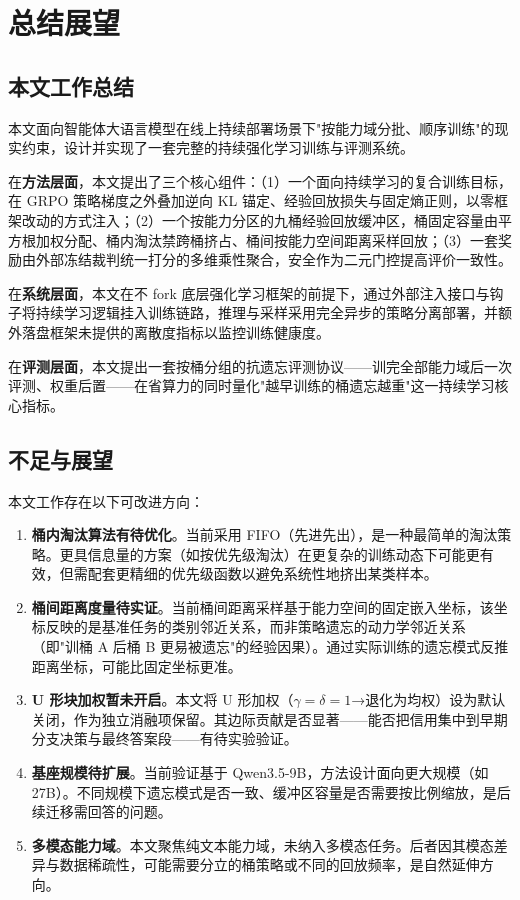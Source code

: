 \chapter{总结展望}
\label{chap:conclusion}

\section{本文工作总结}

本文面向智能体大语言模型在线上持续部署场景下"按能力域分批、顺序训练"的现实约束，设计并实现了一套完整的持续强化学习训练与评测系统。

在\textbf{方法层面}，本文提出了三个核心组件：（1）一个面向持续学习的复合训练目标，在 GRPO 策略梯度之外叠加逆向 KL 锚定、经验回放损失与固定熵正则，以零框架改动的方式注入；（2）一个按能力分区的九桶经验回放缓冲区，桶固定容量由平方根加权分配、桶内淘汰禁跨桶挤占、桶间按能力空间距离采样回放；（3）一套奖励由外部冻结裁判统一打分的多维乘性聚合，安全作为二元门控提高评价一致性。

在\textbf{系统层面}，本文在不 fork 底层强化学习框架的前提下，通过外部注入接口与钩子将持续学习逻辑挂入训练链路，推理与采样采用完全异步的策略分离部署，并额外落盘框架未提供的离散度指标以监控训练健康度。

在\textbf{评测层面}，本文提出一套按桶分组的抗遗忘评测协议——训完全部能力域后一次评测、权重后置——在省算力的同时量化"越早训练的桶遗忘越重"这一持续学习核心指标。

\section{不足与展望}

本文工作存在以下可改进方向：

\begin{enumerate}
  \item \textbf{桶内淘汰算法有待优化}。当前采用 FIFO（先进先出），是一种最简单的淘汰策略。更具信息量的方案（如按优先级淘汰）在更复杂的训练动态下可能更有效，但需配套更精细的优先级函数以避免系统性地挤出某类样本。

  \item \textbf{桶间距离度量待实证}。当前桶间距离采样基于能力空间的固定嵌入坐标，该坐标反映的是基准任务的类别邻近关系，而非策略遗忘的动力学邻近关系（即"训桶 A 后桶 B 更易被遗忘"的经验因果）。通过实际训练的遗忘模式反推距离坐标，可能比固定坐标更准。

  \item \textbf{U 形块加权暂未开启}。本文将 U 形加权（$\gamma=\delta=1$→退化为均权）设为默认关闭，作为独立消融项保留。其边际贡献是否显著——能否把信用集中到早期分支决策与最终答案段——有待实验验证。

  \item \textbf{基座规模待扩展}。当前验证基于 Qwen3.5-9B，方法设计面向更大规模（如 27B）。不同规模下遗忘模式是否一致、缓冲区容量是否需要按比例缩放，是后续迁移需回答的问题。

  \item \textbf{多模态能力域}。本文聚焦纯文本能力域，未纳入多模态任务。后者因其模态差异与数据稀疏性，可能需要分立的桶策略或不同的回放频率，是自然延伸方向。
\end{enumerate}
